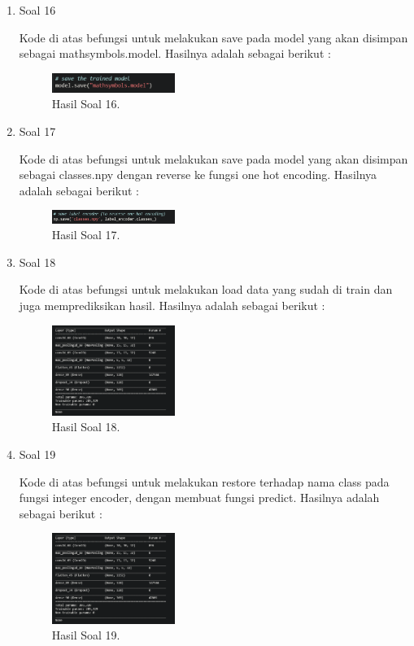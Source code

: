 \begin{enumerate}
	\item Soal 16
	\hfill\break
	
	Kode di atas befungsi untuk melakukan save pada model yang akan disimpan sebagai mathsymbols.model. Hasilnya adalah sebagai berikut :  
	\begin{figure}[H]
	\centering
		\includegraphics[width=4cm]{figures/1174070/7/materi/hasil16.PNG}
		\caption{Hasil Soal 16.}
	\end{figure}

	\item Soal 17
	\hfill\break
	
	Kode di atas befungsi untuk melakukan save pada model yang akan disimpan sebagai classes.npy dengan reverse ke fungsi one hot encoding. Hasilnya adalah sebagai berikut :  
	\begin{figure}[H]
	\centering
		\includegraphics[width=4cm]{figures/1174070/7/materi/hasil17.PNG}
		\caption{Hasil Soal 17.}
	\end{figure}

	\item Soal 18
	\hfill\break
	
	Kode di atas befungsi untuk melakukan load data yang sudah di train dan juga memprediksikan hasil. Hasilnya adalah sebagai berikut :  
	\begin{figure}[H]
	\centering
		\includegraphics[width=4cm]{figures/1174070/7/materi/hasil18.PNG}
		\caption{Hasil Soal 18.}
	\end{figure}

	\item Soal 19
	\hfill\break
	
	Kode di atas befungsi untuk melakukan restore terhadap nama class pada fungsi integer encoder, dengan membuat fungsi predict. Hasilnya adalah sebagai berikut :  
	\begin{figure}[H]
	\centering
		\includegraphics[width=4cm]{figures/1174070/7/materi/hasil19.PNG}
		\caption{Hasil Soal 19.}
	\end{figure}


\end{enumerate}
